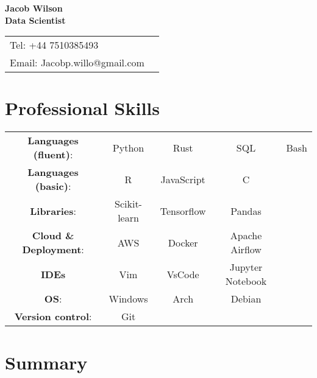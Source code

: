 \documentclass[10pt]{article}
\begin{document}
\linespread{1.0}



{\center
{\Large\bf Jacob Wilson \\ Data Scientist \vspace{0.1in} }

\begin{center}
\begin{tabular*}{1.0\textwidth}%
   {@{\extracolsep{\fill}}lr}
	Tel:   +44 7510385493\\
	Email: Jacobp.willo@gmail.com \\
\end{tabular*}
\end{center}


\addtolength{\itemsep}{-1ex} \addtolength{\topsep}{-1.5ex}


\section*{\bf  Professional Skills}
\begin{center}
\begin{tabular}{c c c c c}
{\bf Languages (fluent)}: & Python & Rust & SQL & Bash \\
{\bf Languages (basic)}: &  R & JavaScript & C\\
{\bf Libraries}:  & Scikit-learn & Tensorflow & Pandas \\
{\bf Cloud \& Deployment}: & AWS & Docker & Apache Airflow\\
{\bf IDEs} & Vim & VsCode & Jupyter Notebook \\
{\bf OS}: & Windows & Arch & Debian \\
{\bf Version control}: & Git

\end{tabular}
\end{center}


\section*{\bf Summary}

}
\end{document}

